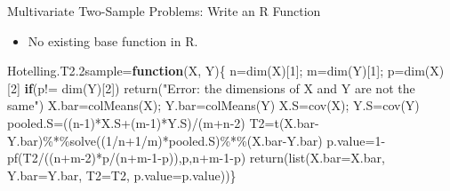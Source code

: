 \documentclass[
  ignorenonframetext,
]{beamer}
\newenvironment{Shaded}{\begin{snugshade}}{\end{snugshade}}
\newcommand{\AttributeTok}[1]{\textcolor[rgb]{0.77,0.63,0.00}{#1}}
\newcommand{\ControlFlowTok}[1]{\textcolor[rgb]{0.13,0.29,0.53}{\textbf{#1}}}
\newcommand{\DecValTok}[1]{\textcolor[rgb]{0.00,0.00,0.81}{#1}}
\newcommand{\FloatTok}[1]{\textcolor[rgb]{0.00,0.00,0.81}{#1}}
\newcommand{\FunctionTok}[1]{\textcolor[rgb]{0.00,0.00,0.00}{#1}}
\newcommand{\NormalTok}[1]{#1}
\newcommand{\OtherTok}[1]{\textcolor[rgb]{0.56,0.35,0.01}{#1}}
\newcommand{\SpecialCharTok}[1]{\textcolor[rgb]{0.00,0.00,0.00}{#1}}
\newcommand{\StringTok}[1]{\textcolor[rgb]{0.31,0.60,0.02}{#1}}
\providecommand{\tightlist}{%
  \setlength{\itemsep}{0pt}\setlength{\parskip}{0pt}}
\begin{document}
\begin{frame}[fragile]{Multivariate Two-Sample Problems: Write an R
Function}
\protect\hypertarget{multivariate-two-sample-problems-write-an-r-function}{}
\begin{itemize}
\tightlist
\item
  No existing base function in R.
\end{itemize}

\tiny

\begin{Shaded}
\begin{Highlighting}[]
\NormalTok{Hotelling.T2}\FloatTok{.2}\NormalTok{sample}\OtherTok{=}\ControlFlowTok{function}\NormalTok{(X, Y)\{}
\NormalTok{  n}\OtherTok{=}\FunctionTok{dim}\NormalTok{(X)[}\DecValTok{1}\NormalTok{]; m}\OtherTok{=}\FunctionTok{dim}\NormalTok{(Y)[}\DecValTok{1}\NormalTok{]; p}\OtherTok{=}\FunctionTok{dim}\NormalTok{(X)[}\DecValTok{2}\NormalTok{]}
  \ControlFlowTok{if}\NormalTok{(p}\SpecialCharTok{!=} \FunctionTok{dim}\NormalTok{(Y)[}\DecValTok{2}\NormalTok{]) }\FunctionTok{return}\NormalTok{(}\StringTok{"Error: the dimensions of X and Y are not the same"}\NormalTok{)}
\NormalTok{  X.bar}\OtherTok{=}\FunctionTok{colMeans}\NormalTok{(X); Y.bar}\OtherTok{=}\FunctionTok{colMeans}\NormalTok{(Y)}
\NormalTok{  X.S}\OtherTok{=}\FunctionTok{cov}\NormalTok{(X); Y.S}\OtherTok{=}\FunctionTok{cov}\NormalTok{(Y)}
\NormalTok{  pooled.S}\OtherTok{=}\NormalTok{((n}\DecValTok{{-}1}\NormalTok{)}\SpecialCharTok{*}\NormalTok{X.S}\SpecialCharTok{+}\NormalTok{(m}\DecValTok{{-}1}\NormalTok{)}\SpecialCharTok{*}\NormalTok{Y.S)}\SpecialCharTok{/}\NormalTok{(m}\SpecialCharTok{+}\NormalTok{n}\DecValTok{{-}2}\NormalTok{)}
\NormalTok{  T2}\OtherTok{=}\FunctionTok{t}\NormalTok{(X.bar}\SpecialCharTok{{-}}\NormalTok{Y.bar)}\SpecialCharTok{\%*\%}\FunctionTok{solve}\NormalTok{((}\DecValTok{1}\SpecialCharTok{/}\NormalTok{n}\SpecialCharTok{+}\DecValTok{1}\SpecialCharTok{/}\NormalTok{m)}\SpecialCharTok{*}\NormalTok{pooled.S)}\SpecialCharTok{\%*\%}\NormalTok{(X.bar}\SpecialCharTok{{-}}\NormalTok{Y.bar)}
\NormalTok{  p.value}\OtherTok{=}\DecValTok{1}\SpecialCharTok{{-}}\FunctionTok{pf}\NormalTok{(T2}\SpecialCharTok{/}\NormalTok{((n}\SpecialCharTok{+}\NormalTok{m}\DecValTok{{-}2}\NormalTok{)}\SpecialCharTok{*}\NormalTok{p}\SpecialCharTok{/}\NormalTok{(n}\SpecialCharTok{+}\NormalTok{m}\DecValTok{{-}1}\SpecialCharTok{{-}}\NormalTok{p)),p,n}\SpecialCharTok{+}\NormalTok{m}\DecValTok{{-}1}\SpecialCharTok{{-}}\NormalTok{p)}
  \FunctionTok{return}\NormalTok{(}\FunctionTok{list}\NormalTok{(}\AttributeTok{X.bar=}\NormalTok{X.bar, }\AttributeTok{Y.bar=}\NormalTok{Y.bar, }\AttributeTok{T2=}\NormalTok{T2, }\AttributeTok{p.value=}\NormalTok{p.value))\}}
\end{Highlighting}
\end{Shaded}

\normalsize
\end{frame}
\end{document}
